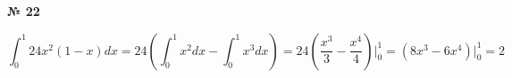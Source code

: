 \documentclass{article}
\begin{document}
\textbf{№ 22} 

$$ \int_{0}^{1} 24x^2(1-x) dx 
= 24 \left( \int_{0}^{1}x^2dx - \int_{0}^{1} x^3dx \right) 
= 24 \left( \frac{x^3}{3} - \frac{x^4}{4} \right) \bigg\vert_{0}^{1}
= \left( 8x^3 - 6x^4 \right) \bigg\vert_{0}^{1}
= 2 $$
\end{document}
